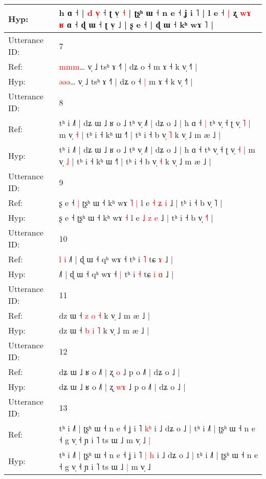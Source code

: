 \documentclass[10pt]{article}
\DeclareRobustCommand{\hl}[1]{{\textcolor{red}{#1}}}
\begin{document}
\begin{longtable}{ll}
 \\
Hyp: & h ɑ ˧ | \hl{d} \hl{v}\hl{̩} ˧ ʈ v̩ \hl{˧} | ʈʂʰ ɯ ˧ n e ˧ ʝ i ˥ | l e ˧\hl{}\hl{}\hl{}\hl{}\hl{} \hl{|} ʐ\hl{}\hl{}\hl{} \hl{}\hl{w}\hl{ɤ} \hl{ʁ} ɑ ˧\hl{}\hl{} ɖ ɯ ˧ ʈ v̩ ˩ | ʂ e ˧ | ɖ ɯ ˧ kʰ wɤ ˥ |
 \\
\midrule
Utterance ID: & 7 \\
Ref: & \hl{m}\hl{m}\hl{m}… v̩ ˩ tsʰ ɤ ˧˥ | dʑ o ˧\hl{}\hl{} m ɤ ˧ k v̩ ˧˥ |
 \\
Hyp: & \hl{ə}\hl{ə}\hl{ə}… v̩ ˩ tsʰ ɤ ˧˥ | dʑ o ˧\hl{ }\hl{|} m ɤ ˧ k v̩ ˧˥ |
 \\
\midrule
Utterance ID: & 8 \\
Ref: & tʰ i ˩˥ | dʑ ɯ ˩ ʁ o ˩ tʰ v̩ ˩˥ | dʑ o ˩ | h ɑ ˧\hl{ }\hl{|} tʰ v̩ ˧ ʈ v̩ \hl{˥} | m v̩ \hl{˧} | tʰ i ˧ kʰ ɯ ˧˥ | tʰ i ˧ b v̩ \hl{˥} k v̩ ˩ m æ ˩ |
 \\
Hyp: & tʰ i ˩˥ | dʑ ɯ ˩ ʁ o ˩ tʰ v̩ ˩˥ | dʑ o ˩ | h ɑ ˧\hl{}\hl{} tʰ v̩ ˧ ʈ v̩ \hl{˧} | m v̩ \hl{˩} | tʰ i ˧ kʰ ɯ ˧˥ | tʰ i ˧ b v̩ \hl{˧} k v̩ ˩ m æ ˩ |
 \\
\midrule
Utterance ID: & 9 \\
Ref: & ʂ e ˧\hl{ }\hl{|} ʈʂʰ ɯ ˧ kʰ wɤ\hl{ }\hl{˥} \hl{|} l e \hl{˧} \hl{ʑ} \hl{i} ˩ | tʰ i ˧ b v̩ \hl{}˥ |
 \\
Hyp: & ʂ e ˧\hl{}\hl{} ʈʂʰ ɯ ˧ kʰ wɤ\hl{}\hl{} \hl{˧} l e \hl{˩} \hl{z} \hl{e} ˩ | tʰ i ˧ b v̩ \hl{˧}˥ |
 \\
\midrule
Utterance ID: & 10 \\
Ref: & \hl{l}\hl{ }\hl{i}\hl{ }˩˥ | ɖ ɯ ˧ qʰ wɤ ˧\hl{}\hl{} tʰ i \hl{˥} tɕ\hl{}\hl{} \hl{ɤ} ˩ |
 \\
Hyp: & \hl{}\hl{}\hl{}\hl{}˩˥ | ɖ ɯ ˧ qʰ wɤ ˧\hl{ }\hl{|} tʰ i \hl{˧} tɕ\hl{ }\hl{i} \hl{ɑ} ˩ |
 \\
\midrule
Utterance ID: & 11 \\
Ref: & dz ɯ ˧ \hl{z} \hl{o} \hl{˧} k v̩ ˩ m æ ˩ |
 \\
Hyp: & dz ɯ ˧ \hl{b} \hl{i} \hl{˥} k v̩ ˩ m æ ˩ |
 \\
\midrule
Utterance ID: & 12 \\
Ref: & dʑ ɯ ˩ ʁ o ˩˥ | ʐ \hl{}\hl{o} ˩ p o ˩˥ | dʑ o ˩ |
 \\
Hyp: & dʑ ɯ ˩ ʁ o ˩˥ | ʐ \hl{w}\hl{ɤ} ˩ p o ˩˥ | dʑ o ˩ |
 \\
\midrule
Utterance ID: & 13 \\
Ref: & tʰ i ˩˥ | ʈʂʰ ɯ ˧ n e ˧ ʝ i ˥ \hl{}\hl{k}\hl{ʰ} i ˩ dʑ o ˩ | tʰ i ˩˥ | ʈʂʰ ɯ ˧ n e ˧ g v̩ ˧ ɲ i ˥ ts ɯ ˩\hl{}\hl{} m v̩ ˩\hl{ }\hl{|}
 \\
Hyp: & tʰ i ˩˥ | ʈʂʰ ɯ ˧ n e ˧ ʝ i ˥ \hl{|}\hl{ }\hl{h} i ˩ dʑ o ˩ | tʰ i ˩˥ | ʈʂʰ ɯ ˧ n e ˧ g v̩ ˧ ɲ i ˥ ts ɯ ˩\hl{ }\hl{|} m v̩ ˩\hl{}\hl{}

\end{longtable}
\end{document}
